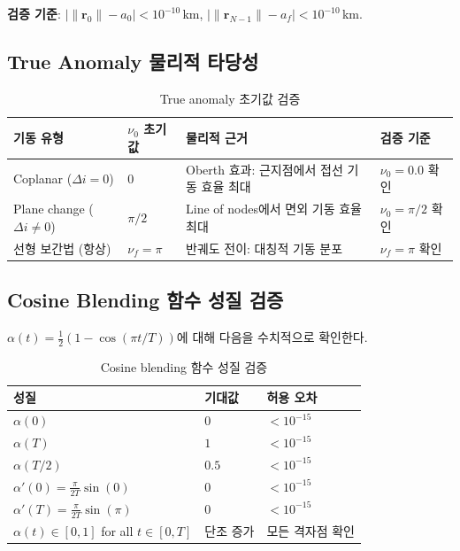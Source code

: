 \documentclass[11pt]{article}
\begin{document}
\textbf{검증 기준}: $\left| \|\mathbf{r}_0\| - a_0 \right| < 10^{-10}$\,km, $\left| \|\mathbf{r}_{N-1}\| - a_f \right| < 10^{-10}$\,km.


\subsection{True Anomaly 물리적 타당성}
\label{sec:verify_nu}

\begin{table}[htbp]
\centering
\caption{True anomaly 초기값 검증}
\label{tab:nu_verification}
\begin{tabular}{@{}llll@{}}
\toprule
기동 유형 & $\nu_0$ 초기값 & 물리적 근거 & 검증 기준 \\
\midrule
Coplanar ($\Delta i = 0$) & $0$ & Oberth 효과: 근지점에서 접선 기동 효율 최대 & $\nu_0 = 0.0$ 확인 \\
Plane change ($\Delta i \ne 0$) & $\pi/2$ & Line of nodes에서 면외 기동 효율 최대 & $\nu_0 = \pi/2$ 확인 \\
선형 보간법 (항상) & $\nu_f = \pi$ & 반궤도 전이: 대칭적 기동 분포 & $\nu_f = \pi$ 확인 \\
\bottomrule
\end{tabular}
\end{table}


\subsection{Cosine Blending 함수 성질 검증}
\label{sec:verify_blending}

$\alpha(t) = \frac{1}{2}(1 - \cos(\pi t/T))$에 대해 다음을 수치적으로 확인한다.

\begin{table}[htbp]
\centering
\caption{Cosine blending 함수 성질 검증}
\label{tab:blending_verification}
\begin{tabular}{@{}lll@{}}
\toprule
성질 & 기대값 & 허용 오차 \\
\midrule
$\alpha(0)$ & $0$ & $< 10^{-15}$ \\
$\alpha(T)$ & $1$ & $< 10^{-15}$ \\
$\alpha(T/2)$ & $0.5$ & $< 10^{-15}$ \\
$\alpha'(0) = \frac{\pi}{2T}\sin(0)$ & $0$ & $< 10^{-15}$ \\
$\alpha'(T) = \frac{\pi}{2T}\sin(\pi)$ & $0$ & $< 10^{-15}$ \\
$\alpha(t) \in [0, 1]$ for all $t \in [0, T]$ & 단조 증가 & 모든 격자점 확인 \\
\bottomrule
\end{tabular}
\end{table}
\end{document}
